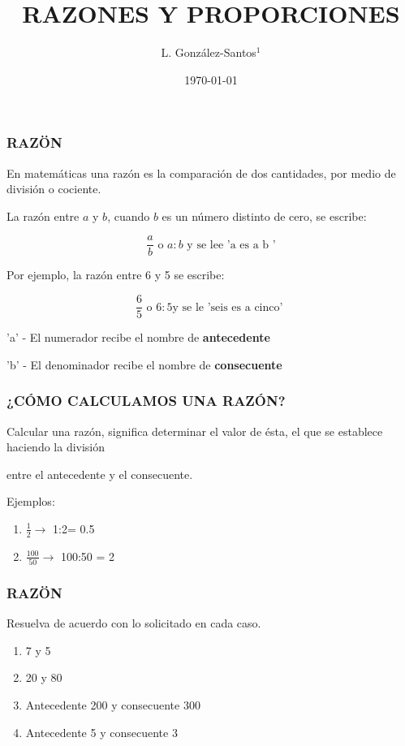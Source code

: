 \documentclass{beamer}
\title[santosg572@gmail.com]{RAZONES Y PROPORCIONES}
\author[L. González-Santos]{
L. González-Santos$^{1}$}
\institute[EDEN \& HELL]{
  $^{1}$
  Instituto de Neurobiología, UNAM\\
  Campus Juriquilla, Qro.
  \and
  \texttt{$^{1}$lgs@unam.mx}
}
\date{\today}
\begin{document}
\frame{\titlepage}

\begin{frame}
    \frametitle{RAZÖN}

En matemáticas una razón es la comparación de dos cantidades, por medio de división o cociente. 

\hfill

La razón entre $a$ y $b$, cuando $b$ es un número distinto de 
cero, se escribe:

$$
\frac{a}{b} \text{   o } a:b \text{ y se lee 'a es a b '}
$$

Por ejemplo, la razón entre 6 y 5 se escribe:

$$
\frac{6}{5} \text{ o } 6:5 \text{y se le 'seis es a cinco' }
$$

'a' - El numerador recibe el nombre de \textbf{antecedente}

\hfill

'b' - El denominador recibe el nombre de \textbf{consecuente}

\end{frame}


\begin{frame}
    \frametitle{¿CÓMO CALCULAMOS UNA RAZÓN?}

Calcular una razón, significa determinar el valor de ésta, el que se establece haciendo la división

entre el antecedente y el consecuente.

\hfill

Ejemplos:

\hfill

\begin{enumerate}
\item $\frac{1}{2} \to $ 1:2= 0.5 
\item $\frac{100}{50} \to $ 100:50 = 2
\end{enumerate}

\end{frame}


\begin{frame}
    \frametitle{RAZÖN}

Resuelva de acuerdo con lo solicitado en cada caso.

\begin{enumerate}
\item 7 y 5
\item 20 y 80
\item Antecedente 200 y consecuente 300
\item Antecedente 5 y consecuente 3
\end{enumerate}

\end{frame}
\end{document}
